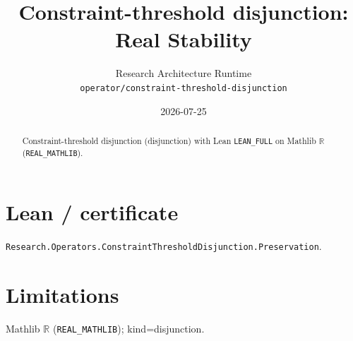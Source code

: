 \documentclass[11pt]{article}
\title{Constraint-threshold disjunction: Real Stability}
\author{Research Architecture Runtime \\ \texttt{operator/constraint-threshold-disjunction}}
\date{2026-07-25}
\begin{document}
\maketitle
\begin{abstract}
Constraint-threshold disjunction (disjunction) with Lean \texttt{LEAN\_FULL} on Mathlib $\mathbb{R}$ (\texttt{REAL\_MATHLIB}).
\end{abstract}
\section{Lean / certificate}
\texttt{Research.Operators.ConstraintThresholdDisjunction.Preservation}.
\section{Limitations}
Mathlib $\mathbb{R}$ (\texttt{REAL\_MATHLIB}); kind=disjunction.
\end{document}
